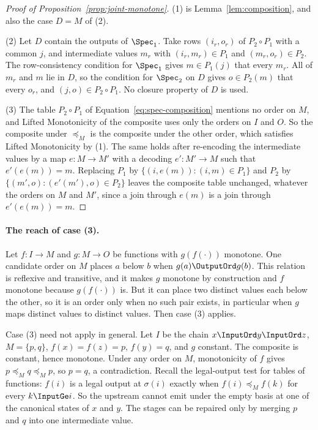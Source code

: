 \begin{proof}[Proof of Proposition~\ref{prop:joint-monotone}]
(1) is Lemma~\ref{lem:composition}, and also the case $D=M$ of (2).

(2) Let $D$ contain the outputs of $\Spec_1$.  Take rows $(i_r,o_r)$ of $P_2\circ
P_1$ with a common \indesc $j$, and intermediate values $m_r$ with
$(i_r,m_r)\in P_1$ and $(m_r,o_r)\in P_2$.  The row-consistency condition for
$\Spec_1$ gives $m\in P_1(j)$ that \outrel every $m_r$.  All of $m_r$ and $m$
lie in $D$, so the condition for $\Spec_2$ on $D$ gives $o\in P_2(m)$ that
\outrel every $o_r$, and $(j,o)\in P_2\circ P_1$.  No closure property of $D$
is used.

(3) The table $P_2\circ P_1$ of Equation~\ref{eq:spec-composition} mentions
no order on $M$, and Lifted Monotonicity of the composite uses only the
orders on $I$ and $O$.  So the composite under $\preceq_M$ is the composite
under the other order, which satisfies Lifted Monotonicity by (1).  The same
holds after re-encoding the intermediate values by a map $e:M\to M'$ with a
decoding $e':M'\to M$ such that $e'(e(m))=m$.  Replacing $P_1$ by
$\{(i,e(m)):(i,m)\in P_1\}$ and $P_2$ by $\{(m',o):(e'(m'),o)\in P_2\}$
leaves the composite table unchanged, whatever the orders on $M$ and $M'$,
since a join through $e(m)$ is a join through $e'(e(m))=m$.
\end{proof}

\paragraph{The reach of case (3).}  Let $f:I\to M$ and $g:M\to O$ be
functions with $g(f(\cdot))$ monotone.  One candidate order on $M$ places $a$
below $b$ when $g(a)\OutputOrd g(b)$.  This relation is reflexive and
transitive, and it makes $g$ monotone by construction and $f$ monotone
because $g(f(\cdot))$ is.  But it can place two distinct values each below
the other, so it is an order only when no such pair exists, in particular
when $g$ maps distinct values to distinct values.  Then case (3) applies.

Case (3) need not apply in general.  Let $I$ be the chain $x\InputOrd
y\InputOrd z$, $M=\{p,q\}$, $f(x)=f(z)=p$, $f(y)=q$, and $g$ constant.  The
composite is constant, hence monotone.  Under any order on $M$, monotonicity
of $f$ gives $p\preceq_M q\preceq_M p$, so $p=q$, a contradiction.  Recall the
legal-output test for tables of functions: $f(i)$ is a legal output at
$\sigma(i)$ exactly when $f(i)\preceq_M f(k)$ for every $k\InputGe i$.  So the
upstream cannot emit under the empty basis at one of the canonical states of
$x$ and $y$.  The stages can be repaired only by merging $p$ and $q$ into one
intermediate value.

